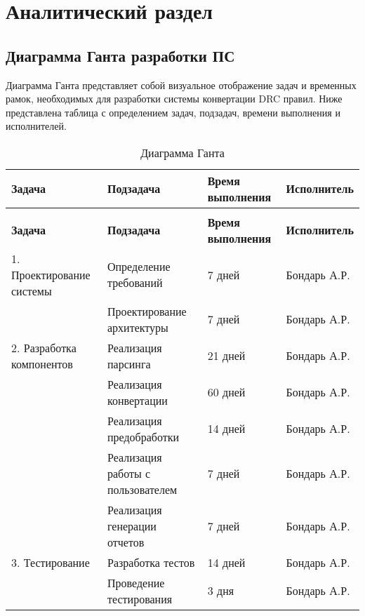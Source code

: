 \chapter{Аналитический раздел}

\section{Диаграмма Ганта разработки ПС}

Диаграмма Ганта представляет собой визуальное отображение задач
и временных рамок, необходимых для разработки системы конвертации DRC правил.
Ниже представлена таблица
с определением задач, подзадач, времени выполнения и исполнителей.

\begin{longtable}{|p{3.5cm}|p{4cm}|p{3cm}|p{4cm}|}
	\caption{Диаграмма Ганта} \label{table:ganta} \\
	\hline
	\textbf{Задача}
	& \textbf{Подзадача}
	& \textbf{Время выполнения}
	& \textbf{Исполнитель} \\
	\hline
	\endfirsthead
	\conttable{table:ganta} \\
	\hline
	\textbf{Задача}
	& \textbf{Подзадача}
	& \textbf{Время выполнения}
	& \textbf{Исполнитель} \\
	\hline
	\endhead
	1. Проектирование системы
	& Определение требований
	& 7 дней
	& Бондарь А.Р. \\ \hline

	& Проектирование архитектуры
	& 7 дней
	& Бондарь А.Р. \\ \hline

	2. Разработка компонентов
	& Реализация парсинга
	& 21 дней
	& Бондарь А.Р. \\ \hline

	& Реализация конвертации
	& 60 дней
	& Бондарь А.Р. \\ \hline

	& Реализация предобработки
	& 14 дней
	& Бондарь А.Р. \\ \hline

	& Реализация работы с пользователем
	& 7 дней
	& Бондарь А.Р. \\ \hline

	& Реализация генерации отчетов
	& 7 дней
	& Бондарь А.Р. \\ \hline

	3. Тестирование
	& Разработка тестов
	& 14 дней
	& Бондарь А.Р. \\ \hline

	& Проведение тестирования
	& 3 дня
	& Бондарь А.Р. \\ \hline


\end{longtable}
